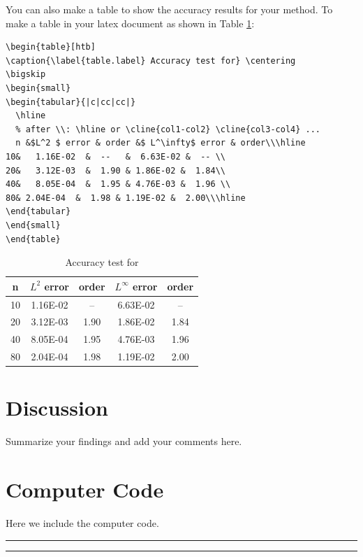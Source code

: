 \documentclass{article}
\begin{document}
You can also make a table to show the accuracy results for your
method. To make a table in your latex document as shown in Table
\ref{table.label}:
\begin{verbatim}
\begin{table}[htb]
\caption{\label{table.label} Accuracy test for} \centering
\bigskip
\begin{small}
\begin{tabular}{|c|cc|cc|}
  \hline
  % after \\: \hline or \cline{col1-col2} \cline{col3-col4} ...
  n &$L^2 $ error & order &$ L^\infty$ error & order\\\hline
10&   1.16E-02  &  --   &  6.63E-02 &  -- \\
20&   3.12E-03  &  1.90 & 1.86E-02 &  1.84\\
40&   8.05E-04  &  1.95 & 4.76E-03 &  1.96 \\
80& 2.04E-04  &  1.98 & 1.19E-02 &  2.00\\\hline
\end{tabular}
\end{small}
\end{table}
\end{verbatim}

\begin{table}[htb]
\caption{\label{table.label} Accuracy test for} \centering
\bigskip
\begin{small}
\begin{tabular}{|c|cc|cc|}
  \hline
  n &$L^2 $ error & order &$ L^\infty$ error & order\\\hline
10&   1.16E-02  &  --   &  6.63E-02 &  -- \\
20&   3.12E-03  &  1.90 & 1.86E-02 &  1.84\\
40&   8.05E-04  &  1.95 & 4.76E-03 &  1.96 \\
80& 2.04E-04  &  1.98 & 1.19E-02 &  2.00 \\\hline
\end{tabular}
\end{small}
\end{table}
\section{Discussion}

Summarize your findings and add your comments here.

\appendix
\section{Computer Code}

Here we include the computer code.

\small \hrule  \hrule
\end{document}
